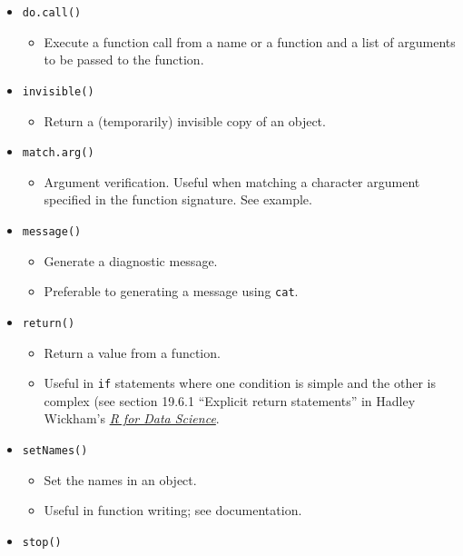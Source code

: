 \documentclass[
]{book}
\providecommand{\tightlist}{%
  \setlength{\itemsep}{0pt}\setlength{\parskip}{0pt}}
\begin{document}
\begin{itemize}
\tightlist
\item
  \texttt{do.call()}

  \begin{itemize}
  \tightlist
  \item
    Execute a function call from a name or a function and a list of arguments to be passed to the function.
  \end{itemize}
\item
  \texttt{invisible()}

  \begin{itemize}
  \tightlist
  \item
    Return a (temporarily) invisible copy of an object.
  \end{itemize}
\item
  \texttt{match.arg()}

  \begin{itemize}
  \tightlist
  \item
    Argument verification. Useful when matching a character argument specified in the function signature. See example.
  \end{itemize}
\item
  \texttt{message()}

  \begin{itemize}
  \tightlist
  \item
    Generate a diagnostic message.
  \item
    Preferable to generating a message using \texttt{cat}.
  \end{itemize}
\item
  \texttt{return()}

  \begin{itemize}
  \tightlist
  \item
    Return a value from a function.
  \item
    Useful in \texttt{if} statements where one condition is simple and the other is complex (see section 19.6.1 ``Explicit return statements'' in Hadley Wickham's \href{https://r4ds.had.co.nz/functions.html}{\emph{R for Data Science}}.
  \end{itemize}
\item
  \texttt{setNames()}

  \begin{itemize}
  \tightlist
  \item
    Set the names in an object.
  \item
    Useful in function writing; see documentation.
  \end{itemize}
\item
  \texttt{stop()}


\end{itemize}
\end{document}
